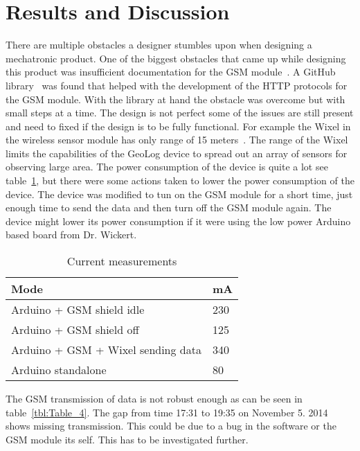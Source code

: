\section{Results and Discussion}
There are multiple obstacles a designer stumbles upon when designing a mechatronic product.
One of the biggest obstacles that came up while designing this product was insufficient documentation for the GSM module~\cite{SM5100B}.
A GitHub library~\cite{meirm} was found that helped with the development of the HTTP protocols for the GSM module. With the library at hand the obstacle was overcome but with small steps at a time.
The design is not perfect some of the issues are still present and need to fixed if the design is to be fully functional. For example the Wixel in the wireless sensor module has only range of 15 meters~\cite{wixel}. The range of the Wixel limits the capabilities of the GeoLog device to spread out an array of sensors for observing large area. The power consumption of the device is quite a lot see table~\ref{tbl:current}, but there were some actions taken to lower the power consumption of the device. The device was modified to tun on the GSM module for a short time, just enough time to send the data and then turn off the GSM module again. The device might lower its power consumption if it were using the low power Arduino based board from Dr. Wickert. 
\begin{table}[H]
	\caption{Current measurements}
	\label{tbl:current}
\begin{tabular}{|p{8cm}|p{8cm}|}
		\hline \textbf{Mode} & \textbf{mA} \\ 
		\hline Arduino + GSM shield idle &   230 \\
		\hline Arduino + GSM shield off &   125 \\
		\hline Arduino + GSM + Wixel sending data &  340 \\
		\hline Arduino standalone & 80 \\
		\hline
	\end{tabular}
\end{table}
The GSM transmission of data is not robust enough as can be seen in table~\ref{tbl:Table_4}. The gap from time 17:31 to 19:35 on November 5. 2014 shows missing transmission. This could be due to a bug in the software or the GSM module its self. This has to be investigated further.



